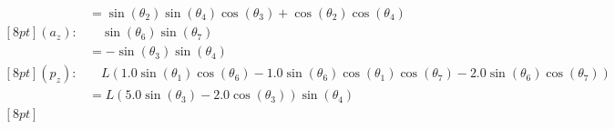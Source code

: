 \documentclass[12pt, a4paper]{article}
\begin{document}
\begin{align}
&= \sin{\left(\theta_{2} \right)} \sin{\left(\theta_{4} \right)} \cos{\left(\theta_{3} \right)} + \cos{\left(\theta_{2} \right)} \cos{\left(\theta_{4} \right)} \\ [8pt] 
(a_{z}): & \quad \sin{\left(\theta_{6} \right)} \sin{\left(\theta_{7} \right)} \\ 
&= - \sin{\left(\theta_{3} \right)} \sin{\left(\theta_{4} \right)} \\ [8pt] 
(p_{z}): & \quad L \left(1.0 \sin{\left(\theta_{1} \right)} \cos{\left(\theta_{6} \right)} - 1.0 \sin{\left(\theta_{6} \right)} \cos{\left(\theta_{1} \right)} \cos{\left(\theta_{7} \right)} - 2.0 \sin{\left(\theta_{6} \right)} \cos{\left(\theta_{7} \right)}\right) \\ 
&= L \left(5.0 \sin{\left(\theta_{3} \right)} - 2.0 \cos{\left(\theta_{3} \right)}\right) \sin{\left(\theta_{4} \right)} \\ [8pt] 
\end{align}

\newpage
\end{document}
